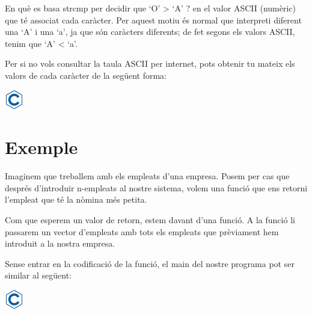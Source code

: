 \documentclass[]{book}
\newenvironment{Shaded}{\begin{snugshade}}{\end{snugshade}}
\newcommand{\DataTypeTok}[1]{\textcolor[rgb]{0.13,0.29,0.53}{#1}}
\newcommand{\DecValTok}[1]{\textcolor[rgb]{0.00,0.00,0.81}{#1}}
\newcommand{\SpecialCharTok}[1]{\textcolor[rgb]{0.00,0.00,0.00}{#1}}
\newcommand{\StringTok}[1]{\textcolor[rgb]{0.31,0.60,0.02}{#1}}
\newcommand{\ImportTok}[1]{#1}
\newcommand{\CommentTok}[1]{\textcolor[rgb]{0.56,0.35,0.01}{\textit{#1}}}
\newcommand{\ControlFlowTok}[1]{\textcolor[rgb]{0.13,0.29,0.53}{\textbf{#1}}}
\newcommand{\PreprocessorTok}[1]{\textcolor[rgb]{0.56,0.35,0.01}{\textit{#1}}}
\newcommand{\NormalTok}[1]{#1}
\begin{document}
En què es basa strcmp per decidir que `O' \textgreater{} `A' ? en el
valor ASCII (numèric) que té associat cada caràcter. Per aquest motiu és
normal que interpreti diferent una `A' i una `a', ja que són caràcters
diferents; de fet segons els valors ASCII, tenim que `A' \textless{}
`a'.

Per si no vols consultar la taula ASCII per internet, pots obtenir tu
mateix els valors de cada caràcter de la següent forma:

\includegraphics{./img/c.png}

\begin{Shaded}
\end{Shaded}

\section{Exemple}\label{exemple}

Imaginem que treballem amb els empleats d'una empresa. Posem per cas que
després d'introduir n-empleats al nostre sistema, volem una funció que
ens retorni l'empleat que té la nòmina més petita.

Com que esperem un valor de retorn, estem davant d'una funció. A la
funció li passarem un vector d'empleats amb tots els empleats que
prèviament hem introduit a la nostra empresa.

Sense entrar en la codificació de la funció, el main del nostre programa
pot ser similar al següent:

\includegraphics{./img/c.png}
\end{document}

